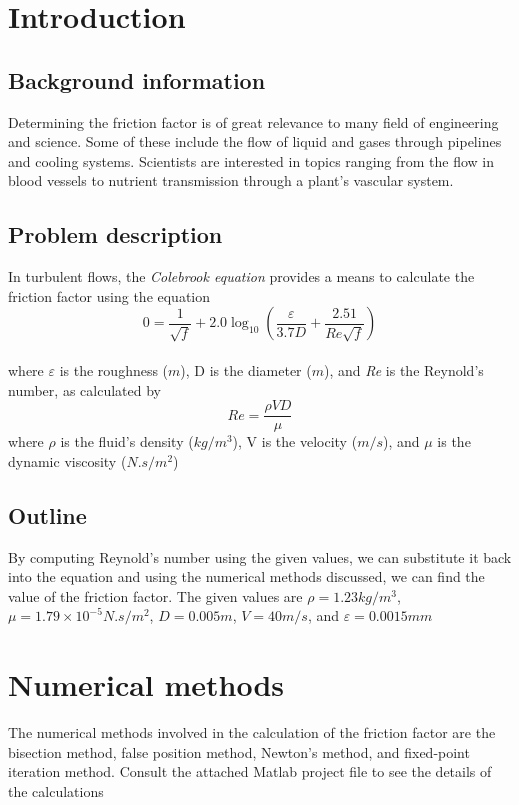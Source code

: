 \documentclass{book}
\begin{document}
	\section{Introduction}
	
	\subsection{Background information}
	Determining the friction factor is of great relevance to many field of engineering and science. Some of these include the flow of liquid and gases through pipelines and cooling systems. Scientists are interested in topics ranging from the flow in blood vessels to nutrient transmission through a plant's vascular system.
	
	\subsection{Problem description}
	In turbulent flows, the \textit{Colebrook equation} provides a means to calculate the friction factor using the equation\\
    \[ 0 =  \frac{1}{\sqrt{f}} + 2.0 \log_{10} \left(\frac{\varepsilon}{3.7D} + \frac{2.51}{\textit{Re}\sqrt{f}}\right) \] \\
    where $\varepsilon$ is the roughness (${m}$), D is the diameter (${m}$), and \textit{Re} is the Reynold's number, as calculated by
    \[\textit{Re} = \frac{\rho V D}{\mu}\]
    where $\rho$ is the fluid's density (${kg/m^{3}}$), V is the velocity (${m/s}$), and ${\mu}$ is the dynamic viscosity (${N.s/m^2}$)
    
	\subsection{Outline}
	By computing Reynold's number using the given values, we can substitute it back into the equation and using the numerical methods discussed, we can find the value of the friction factor. The given values are ${\rho = 1.23 kg/m^3}$, ${\mu = 1.79 \times 10^{-5} N.s/m^2}$, ${D = 0.005 m}$, ${V = 40 m/s}$, and ${\varepsilon = 0.0015 mm}$
	
	\section{Numerical methods}
	The numerical methods involved in the calculation of the friction factor are the bisection method, false position method, Newton's method, and fixed-point iteration method. Consult the attached Matlab project file to see the details of the calculations
	
\end{document}
